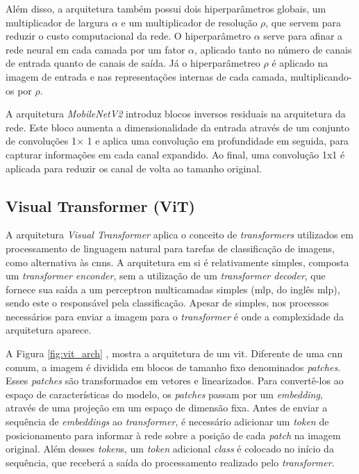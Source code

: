 Além disso, a arquitetura também possui dois hiperparâmetros globais, um multiplicador de largura $\alpha$ e um multiplicador de resolução $\rho$, que servem para reduzir o custo computacional da rede. O hiperparâmetro $\alpha$ serve para afinar a rede neural em cada camada por um fator $\alpha$, aplicado tanto no número de canais de entrada quanto de canais de saída. Já o hiperparâmetreo $\rho$ é aplicado na imagem de entrada e nas representações internas de cada camada, multiplicando-os por $\rho$.

A arquitetura \textit{MobileNetV2}\cite{mobilenetv2} introduz blocos inversos residuais na arquitetura da rede. Este bloco aumenta a dimensionalidade da entrada através de um conjunto de convoluções 1$\times$ 1 e aplica uma convolução em profundidade em seguida, para capturar informações em cada canal expandido. Ao final, uma convolução 1x1 é aplicada para reduzir os canal de volta ao tamanho original.

\subsection{Visual Transformer (ViT)}
A arquitetura \textit{Visual Transformer}\cite{vit} aplica o conceito de \textit{transformers}\cite{transformer2017} 
utilizados em processamento de linguagem natural para tarefas de classificação de imagens, como alternativa às \acrshort{cnn}s. 
A arquitetura em si é relativamente simples, composta um \textit{transformer enconder}, sem a utilização de um \textit{transformer decoder}, 
que fornece sua saída a um perceptron multicamadas simples (\acrshort{mlp}, do inglês \acrlong{mlp}), sendo este o responsável pela classificação. 
Apesar de simples, nos processos necessários para enviar a imagem para o \textit{transformer} é onde a complexidade da arquitetura aparece.

A Figura \ref{fig:vit_arch} \cite{vit}, mostra a arquitetura de um \acrshort{vit}. 
Diferente de uma \acrshort{cnn} comum, a imagem é dividida em blocos de tamanho fixo denominados \textit{patches}. 
Esses \textit{patches} são transformados em vetores e linearizados. 
Para convertê-los ao espaço de características do modelo, os \textit{patches} passam por um \textit{embedding}, através de uma projeção em um espaço de dimensão fixa. 
Antes de enviar a sequência de \textit{embeddings} ao \textit{transformer}, 
é necessário adicionar um \textit{token} de posicionamento para informar à rede sobre a posição de cada \textit{patch} na imagem original. 
Além desses \textit{token}s, um \textit{token} adicional \textit{class} é colocado no início da sequência, que receberá a saída do processamento realizado pelo \textit{transformer}.

